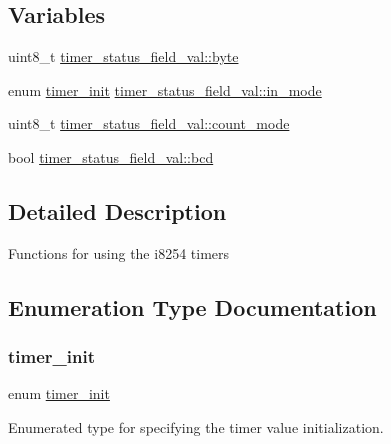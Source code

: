 \subsection*{Variables}
\begin{DoxyCompactItemize}
\item 
uint8\+\_\+t \mbox{\hyperlink{group__timer_ga37d15361e9d111d7f18f943d85964f51}{timer\+\_\+status\+\_\+field\+\_\+val\+::byte}}
\item 
enum \mbox{\hyperlink{group__timer_ga5cc20f14fd50625eea9b20f58fbe2a55}{timer\+\_\+init}} \mbox{\hyperlink{group__timer_ga16c0028c537ce578196381bdc0cd97fd}{timer\+\_\+status\+\_\+field\+\_\+val\+::in\+\_\+mode}}
\item 
uint8\+\_\+t \mbox{\hyperlink{group__timer_ga069cd58184fd977a3345d560f159037a}{timer\+\_\+status\+\_\+field\+\_\+val\+::count\+\_\+mode}}
\item 
bool \mbox{\hyperlink{group__timer_gad1c0daae1fe44fc16a05f435123a99f2}{timer\+\_\+status\+\_\+field\+\_\+val\+::bcd}}
\end{DoxyCompactItemize}


\subsection{Detailed Description}
Functions for using the i8254 timers 

\subsection{Enumeration Type Documentation}
\mbox{\label{group__timer_ga5cc20f14fd50625eea9b20f58fbe2a55}} 
\subsubsection{\texorpdfstring{timer\_init}{timer\_init}}
{\footnotesize\ttfamily enum \mbox{\hyperlink{group__timer_ga5cc20f14fd50625eea9b20f58fbe2a55}{timer\+\_\+init}}}



Enumerated type for specifying the timer value initialization. 


